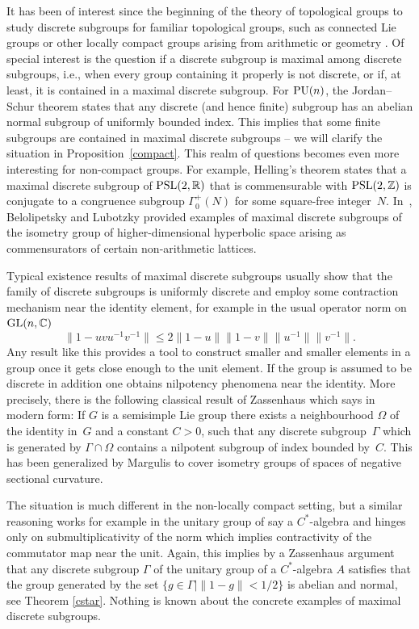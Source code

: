 \documentclass[pdftex]{sigma}
\numberwithin{equation}{section}
\begin{document}
It has been of interest since the beginning of the theory of topological groups to study discrete subgroups for familiar topological groups, such as connected Lie groups or other locally compact groups arising from arithmetic or geometry
\cite{MR212021,MR2198218,MR0209363,MR41145,MR171781,MR29918,MR374340}. Of special interest is the question if a discrete subgroup is maximal among discrete subgroups, i.e., when every group containing it properly is not discrete, or if, at least, it is contained in a maximal discrete subgroup. For ${\rm PU}(n)$, the Jordan--Schur theorem states that any discrete (and hence finite) subgroup has an abelian normal subgroup of uniformly bounded index. This implies that some finite subgroups are contained in maximal discrete subgroups -- we will clarify the situation in Proposition~\ref{compact}. This realm of questions becomes even more interesting for non-compact groups. For example, Helling's theorem \cite{MR228437} states that a maximal discrete subgroup of ${\rm PSL}(2,\mathbb R)$ that is commensurable with ${\rm PSL}(2,\mathbb Z)$ is conjugate to a congruence subgroup $\Gamma^+_0(N)$ for some square-free integer~$N$. In~\cite{MR2198218}, Belolipetsky and Lubotzky provided examples of maximal discrete subgroups of the isometry group of higher-dimensional hyperbolic space arising as commensurators of certain non-arithmetic lattices.

Typical existence results of maximal discrete subgroups usually show that the family of discrete subgroups is uniformly discrete and employ some contraction mechanism near the identity element, for example in the usual operator norm on ${\rm GL}(n,\mathbb C)$
\[\big\|1-uvu^{-1}v^{-1}\big\| \leq 2 \|1-u\| \|1-v\| \big\|u^{-1}\big\| \big\|v^{-1}\big\|.\]
Any result like this provides a tool to construct smaller and smaller elements in a group once it gets close enough to the unit element. If the group is assumed to be discrete in addition one obtains nilpotency phenomena near the identity. More precisely, there is the following classical result of Zassenhaus \cite{MR3069692} which says in modern form: If $G$ is a semisimple Lie group there exists a neighbourhood $\Omega$ of the identity in~$G$ and a constant $C > 0$, such that any discrete subgroup~$\Gamma$ which is generated by $\Gamma \cap \Omega$ contains a nilpotent subgroup of index bounded by~$C$. This has been generalized by Margulis to cover isometry groups of spaces of negative sectional curvature.

The situation is much different in the non-locally compact setting, but a similar reasoning works for example in the unitary group of say a $C^*$-algebra and hinges only on submultiplicativity of the norm which implies contractivity of the commutator map near the unit. Again, this implies by a Zassenhaus argument that any discrete subgroup $\Gamma$ of the unitary group of a $C^*$-algebra $A$ satisfies that the group generated by the set
$\{g \in \Gamma \mid \|1-g\|<1/2 \}$ is abelian and normal, see Theorem \ref{cstar}. Nothing is known about the concrete examples of maximal discrete subgroups.
\end{document}

